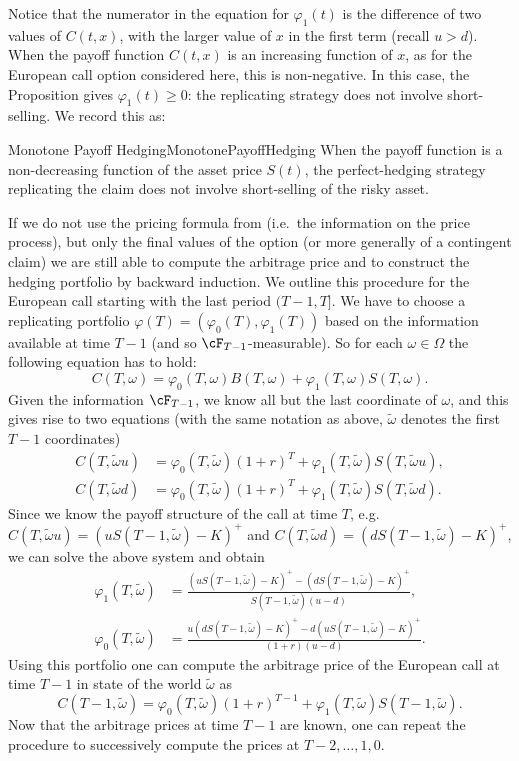 Notice that the numerator in the equation for $\varphi_1(t)$ is the difference of two values of $C(t, x)$, with the larger value of $x$ in the first term (recall $u > d$). When the payoff function $C(t, x)$ is an increasing function of $x$, as for the European call option considered here, this is non-negative. In this case, the Proposition gives $\varphi_1(t) \ge 0$: the replicating strategy does not involve short-selling. We record this as:

\begin{cor}{Monotone Payoff Hedging}{MonotonePayoffHedging}
	When the payoff function is a non-decreasing function of the asset price $S(t)$, the perfect-hedging strategy replicating the claim does not involve short-selling of the risky asset.
\end{cor}

If we do not use the pricing formula from  (i.e.\ the information on the price process), but only the final values of the option (or more generally of a contingent claim) we are still able to compute the arbitrage price and to construct the hedging portfolio by backward induction. We outline this procedure for the European call starting with the last period $(T-1, T]$. We have to choose a replicating portfolio $\varphi(T) = (\varphi_0(T), \varphi_1(T))$ based on the information available at time $T-1$ (and so $\cF_{T-1}$-measurable). So for each $\omega \in \Omega$ the following equation has to hold:
\[
	C(T, \omega) = \varphi_0(T, \omega)B(T, \omega) + \varphi_1(T, \omega)S(T, \omega).
\]
Given the information $\cF_{T-1}$, we know all but the last coordinate of $\omega$, and this gives rise to two equations (with the same notation as above, $\tilde{\omega}$ denotes the first $T-1$ coordinates)
\begin{align*}
	C(T, \tilde{\omega}u) & = \varphi_0(T, \tilde{\omega})(1+r)^T + \varphi_1(T, \tilde{\omega})S(T, \tilde{\omega}u), \\
	C(T, \tilde{\omega}d) & = \varphi_0(T, \tilde{\omega})(1+r)^T + \varphi_1(T, \tilde{\omega})S(T, \tilde{\omega}d).
\end{align*}
Since we know the payoff structure of the call at time $T$, e.g.\ $C(T, \tilde{\omega}u) = (uS(T-1, \tilde{\omega}) - K)^{+}$ and $C(T, \tilde{\omega}d) = (dS(T-1, \tilde{\omega}) - K)^{+}$, we can solve the above system and obtain
\begin{align*}
	\varphi_1(T, \tilde{\omega}) & = \frac{(uS(T-1, \tilde{\omega}) - K)^{+} - (dS(T-1, \tilde{\omega}) - K)^{+}}{S(T-1, \tilde{\omega})(u - d)}, \\
	\varphi_0(T, \tilde{\omega}) & = \frac{u(dS(T-1, \tilde{\omega}) - K)^{+} - d(uS(T-1, \tilde{\omega}) - K)^{+}}{(1+r)(u - d)}.
\end{align*}
Using this portfolio one can compute the arbitrage price of the European call at time $T-1$ in state of the world $\tilde{\omega}$ as
\[
	C(T-1, \tilde{\omega}) = \varphi_0(T, \tilde{\omega})(1+r)^{T-1} + \varphi_1(T, \tilde{\omega})S(T-1, \tilde{\omega}).
\]
Now that the arbitrage prices at time $T-1$ are known, one can repeat the procedure to successively compute the prices at $T-2, \dots, 1, 0$.

